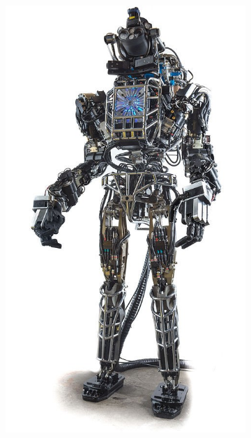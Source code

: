 \begin{figure}[h]
    \centering
    \begin{subfigure}{0.26\textwidth}
        \includegraphics[width=\textwidth]{figures/Atlas_frontview_2013.jpg}
    \end{subfigure}%
    \hfill
    \begin{subfigure}{0.23\textwidth}

\end{subfigure}
\end{figure}
